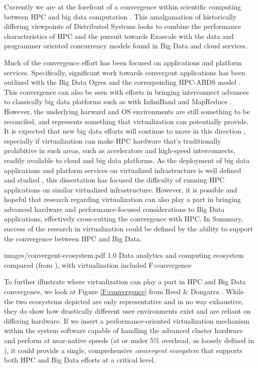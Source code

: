 Currently we are at the forefront of a convergence within scientific computing between HPC and big data computation \cite{reed2015exascale}. This amalgamation of historically differing viewpoints of Distributed Systems looks to combine the performance characteristics of HPC and the pursuit towards Exascale with the data and programmer oriented concurrency models found in Big Data and cloud services. 

Much of the convergence effort has been focused on applications and platform services. Specifically, significant work towards convergent applications has been outlined with the Big Data Ogres \cite{Jha2014apache} and the corresponding HPC-ABDS model \cite{qiu2014towards}.  This convergence can also be seen with efforts in bringing interconnect advances to classically big data platforms such as with InfiniBand and MapReduce \cite{panda2013hadoop}. However, the underlying harward and OS environments are still something to be reconciled, and represents something that virtualization can potentially provide. It is expected that new big data efforts will continue to move in this direction \cite{ekanayake2016spidal}, especially if virtualization can make HPC hardware that's traditionally prohibitive in such areas, such as accelerators and high-speed interconnects, readily available to cloud and big data platforms. As the deployment of big data applications and platform services on virtualized infrastructure is well defined and studied \cite{tian2011towards}, this dissertation has focused the difficulty of running HPC applications on similar virtualized infrastructure.  However, it is possible and hopeful that research regarding virtualization can also play a part in bringing advanced hardware and performance-focused considerations to Big Data applications, effectively cross-cutting the convergence with HPC. In Summary, success of the research in virtualization could be defined by the ability to support the convergence between HPC and Big Data.

 {images/convergent-ecosystem.pdf}
 {1.0}
 {Data analytics and computing ecosystem compared (from \cite{reed2015exascale}), with virtualization included}
 {F:convergence}


To further illustrate where virtualization can play a part in HPC and Big Data convergence, we look at Figure \ref{F:convergence} from Reed \& Dongarra \cite{reed2015exascale}. While the two ecosystems depicted are only representative and in no way exhaustive, they do show how drastically different user environments exist and are reliant on differing hardware. If we insert a performance-oriented virtualization mechanism within the system software capable of handling the advanced cluster hardware and perform at near-native speeds (at or under 5\% overhead, as loosely defined in \cite{lange2010palacios}), it could provide a single, comprehensive \emph{convergent ecosystem} that supports both HPC and Big Data efforts at a critical level. 


